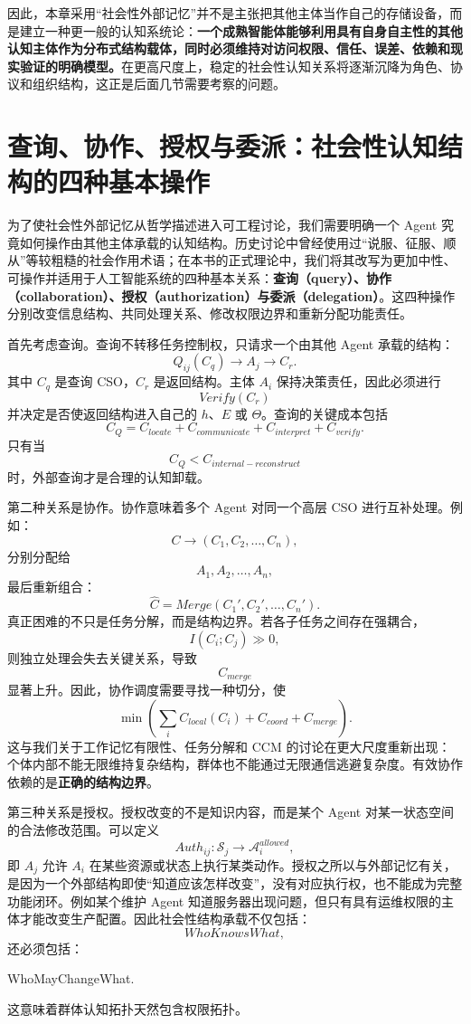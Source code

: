 因此，本章采用``社会性外部记忆''并不是主张把其他主体当作自己的存储设备，而是建立一种更一般的认知系统论：\textbf{一个成熟智能体能够利用具有自身自主性的其他认知主体作为分布式结构载体，同时必须维持对访问权限、信任、误差、依赖和现实验证的明确模型。}在更高尺度上，稳定的社会性认知关系将逐渐沉降为角色、协议和组织结构，这正是后面几节需要考察的问题。

\section{查询、协作、授权与委派：社会性认知结构的四种基本操作}

为了使社会性外部记忆从哲学描述进入可工程讨论，我们需要明确一个 Agent 究竟如何操作由其他主体承载的认知结构。历史讨论中曾经使用过``说服、征服、顺从''等较粗糙的社会作用术语；在本书的正式理论中，我们将其改写为更加中性、可操作并适用于人工智能系统的四种基本关系：\textbf{查询（query）、协作（collaboration）、授权（authorization）与委派（delegation）}。这四种操作分别改变信息结构、共同处理关系、修改权限边界和重新分配功能责任。

首先考虑查询。查询不转移任务控制权，只请求一个由其他 Agent 承载的结构：
\[
Q_{ij}(C_q)
\rightarrow
A_j
\rightarrow
C_r.
\]
其中 $C_q$ 是查询 CSO，$C_r$ 是返回结构。主体 $A_i$ 保持决策责任，因此必须进行
\[
Verify(C_r)
\]
并决定是否使返回结构进入自己的 $h$、$E$ 或 $\Theta$。查询的关键成本包括
\[
C_Q
=
C_{locate}
+
C_{communicate}
+
C_{interpret}
+
C_{verify}.
\]
只有当
\[
C_Q<C_{internal-reconstruct}
\]
时，外部查询才是合理的认知卸载。

第二种关系是协作。协作意味着多个 Agent 对同一个高层 CSO 进行互补处理。例如：
\[
C
\rightarrow
(C_1,C_2,\ldots,C_n),
\]
分别分配给
\[
A_1,A_2,\ldots,A_n,
\]
最后重新组合：
\[
\hat C
=
Merge(C_1',C_2',\ldots,C_n').
\]
真正困难的不只是任务分解，而是结构边界。若各子任务之间存在强耦合，
\[
I(C_i;C_j)\gg0,
\]
则独立处理会失去关键关系，导致
\[
C_{merge}
\]
显著上升。因此，协作调度需要寻找一种切分，使
\[
\min
\left(
\sum_i C_{local}(C_i)
+
C_{coord}
+
C_{merge}
\right).
\]
这与我们关于工作记忆有限性、任务分解和 CCM 的讨论在更大尺度重新出现：个体内部不能无限维持复杂结构，群体也不能通过无限通信逃避复杂度。有效协作依赖的是\textbf{正确的结构边界}。

第三种关系是授权。授权改变的不是知识内容，而是某个 Agent 对某一状态空间的合法修改范围。可以定义
\[
Auth_{ij}
:
\mathcal S_j
\rightarrow
\mathcal A_i^{allowed},
\]
即 $A_j$ 允许 $A_i$ 在某些资源或状态上执行某类动作。授权之所以与外部记忆有关，是因为一个外部结构即使``知道应该怎样改变''，没有对应执行权，也不能成为完整功能闭环。例如某个维护 Agent 知道服务器出现问题，但只有具有运维权限的主体才能改变生产配置。因此社会性结构承载不仅包括：
\[
WhoKnowsWhat,
\]
还必须包括：
\begin{statementbox}
WhoMayChangeWhat.
\end{statementbox}
这意味着群体认知拓扑天然包含权限拓扑。

